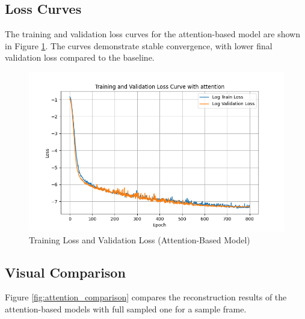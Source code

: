 \documentclass{article}
\begin{document}
\subsection{Loss Curves}
The training and validation loss curves for the attention-based model are shown in Figure \ref{fig:loss_attention}. The curves demonstrate stable convergence, with lower final validation loss compared to the baseline.

\begin{figure}[H]
  \centering
  \includegraphics[width=\linewidth]{../assets/Training Loss and Validation Loss with attention.png}
  \caption{Training Loss and Validation Loss (Attention-Based Model)}
  \label{fig:loss_attention}
\end{figure}

\subsection{Visual Comparison}
Figure \ref{fig:attention_comparison} compares the reconstruction results of the attention-based models with full sampled one for a sample frame. 
\end{document}
